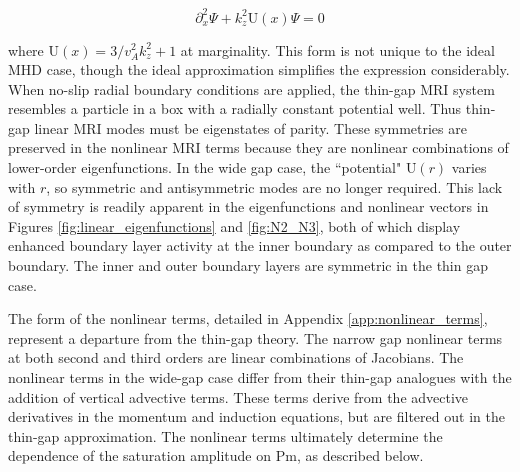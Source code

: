 \documentclass{emulateapj}
\newcommand{\beq}{\begin{equation}}
\newcommand{\eeq}{\end{equation}}
\newcommand{\Pm}{\mathrm{Pm}}
\begin{document}
\beq
\partial_x^2 \Psi + k_z^2 \mathrm{U}(x) \Psi = 0
\eeq 

where $\mathrm{U}(x) = {3}/{v_A^2 k_z^2} + 1$ at marginality. This form is not unique to the ideal MHD case, though the ideal approximation simplifies the expression considerably. When no-slip radial boundary conditions are applied, the thin-gap MRI system resembles a particle in a box with a radially constant potential well. Thus thin-gap linear MRI modes must be eigenstates of parity. These symmetries are preserved in the nonlinear MRI terms because they are nonlinear combinations of lower-order eigenfunctions. In the wide gap case, the ``potential" $\mathrm{U}(r)$ varies with $r$, so symmetric and antisymmetric modes are no longer required. This lack of symmetry is readily apparent in the eigenfunctions and nonlinear vectors in Figures \ref{fig:linear_eigenfunctions} and \ref{fig:N2_N3}, both of which display enhanced boundary layer activity at the inner boundary as compared to the outer boundary. The inner and outer boundary layers are symmetric in the thin gap case.

The form of the nonlinear terms, detailed in Appendix \ref{app:nonlinear_terms}, represent a departure from the thin-gap theory. The narrow gap nonlinear terms at both second and third orders are linear combinations of Jacobians. The nonlinear terms in the wide-gap case differ from their thin-gap analogues with the addition of vertical advective terms. These terms derive from the advective derivatives in the momentum and induction equations, but are filtered out in the thin-gap approximation. The nonlinear terms ultimately determine the dependence of the saturation amplitude on $\Pm$, as described below. %
\end{document}
